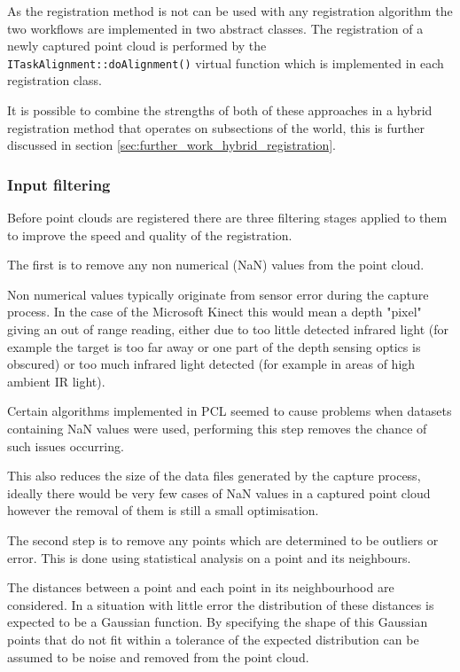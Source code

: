 \documentclass{entcs}
\begin{document}
As the registration method is not  can be used with any registration algorithm
the two workflows are implemented in two abstract classes. The registration of
a newly captured point cloud is performed by the
\texttt{ITaskAlignment::doAlignment()} virtual function which is implemented in
each registration class.

It is possible to combine the strengths of both of these approaches in a hybrid
registration method that operates on subsections of the world, this is further
discussed in section \ref{sec:further_work_hybrid_registration}.

\subsubsection{Input filtering}
\label{sec:input_filtering}

Before point clouds are registered there are three filtering stages applied to
them to improve the speed and quality of the registration.

The first is to remove any non numerical (NaN) values from the point cloud.

Non numerical values typically originate from sensor error during the capture
process. In the case of the Microsoft Kinect this would mean a depth "pixel"
giving an out of range reading, either due to too little detected infrared light
(for example the target is too far away or one part of the depth sensing optics
is obscured) or too much infrared light detected (for example in areas of high
ambient IR light).

Certain algorithms implemented in PCL seemed to cause problems when datasets
containing NaN values were used, performing this step removes the chance of such
issues occurring.

This also reduces the size of the data files generated by the capture process,
ideally there would be very few cases of NaN values in a captured point cloud
however the removal of them is still a small optimisation.

The second step is to remove any points which are determined to be outliers or
error. This is done using statistical analysis on a point and its neighbours.

The distances between a point and each point in its neighbourhood are
considered. In a situation with little error the distribution of these distances
is expected to be a Gaussian function. By specifying the shape of this Gaussian
points that do not fit within a tolerance of the expected distribution can be
assumed to be noise and removed from the point cloud.
\end{document}
